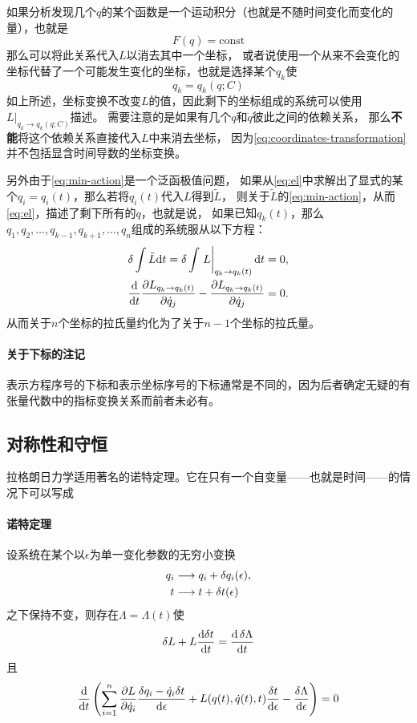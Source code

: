 \documentclass[UTF8, a4paper]{ctexart}
\newcommand*{\diff}{\mathop{}\!\mathrm{d}}
\newcommand*{\const}{\mathrm{const}}
\begin{document}
如果分析发现几个$q$的某个函数是一个运动积分（也就是不随时间变化而变化的量），也就是
\[
    F(q) = \const
\]
那么可以将此关系代入$L$以消去其中一个坐标，
或者说使用一个从来不会变化的坐标代替了一个可能发生变化的坐标，也就是选择某个$q_k$使
\[
    q_k = q_k(q;C)
\]
如上所述，坐标变换不改变$L$的值，因此剩下的坐标组成的系统可以使用$L|_{q_k\to q_k(q;C)}$描述。
需要注意的是如果有几个$q$和$\dot{q}$彼此之间的依赖关系，
那么\textbf{不能}将这个依赖关系直接代入$L$中来消去坐标，
因为\eqref{eq:coordinates-transformation}并不包括显含时间导数的坐标变换。

另外由于\eqref{eq:min-action}是一个泛函极值问题，
如果从\eqref{eq:el}中求解出了显式的某个$q_i=q_i(t)$，那么若将$q_i(t)$代入$L$得到$\tilde{L}$，
则关于$\tilde{L}$的\eqref{eq:min-action}，从而\eqref{eq:el}，描述了剩下所有的$q$，也就是说，
如果已知$q_k(t)$，那么$q_1, q_2, \ldots, q_{k-1}, q_{k+1}, \ldots, q_n$组成的系统服从以下方程：
\[
    \begin{split}
        \var \int \tilde{L} \dd t = \var \int \eval{L}_{q_k \to q_k(t)} \dd t = 0, \\
        \dv{t} \pdv{L_{q_k \to q_k(t)}}{\dot{q}_j} - \pdv{L_{q_k \to q_k(t)}}{\dot{q}_j} = 0.
    \end{split}
\]
从而关于$n$个坐标的拉氏量约化为了关于$n-1$个坐标的拉氏量。

\paragraph{关于下标的注记}
表示方程序号的下标和表示坐标序号的下标通常是不同的，因为后者确定无疑的有张量代数中的指标变换关系而前者未必有。

\subsection{对称性和守恒}\label{sec:symmetry-and-conservation}

拉格朗日力学适用著名的诺特定理。它在只有一个自变量——也就是时间——的情况下可以写成
\paragraph{诺特定理} 设系统在某个以$\epsilon$为单一变化参数的无穷小变换
\[
    \begin{aligned}
        q_i &\longrightarrow q_i + \var q_i(\epsilon), \\
        t &\longrightarrow t + \var t(\epsilon)
    \end{aligned}
\]
之下保持不变，则存在$\Lambda=\Lambda(t)$使
\[
    \var L + L \frac{\diff \var t}{\diff t}
    = \dv{\var{\Lambda}}{t} 
\]
且
\begin{equation}
    \frac{\diff }{\diff t} \left(
        \sum_{i=1}^n \frac{\partial L}{\partial \dot{q}_i} \frac{\var q_i - \dot{q}_i \var t}{\diff \epsilon}
        + L(q(t), \dot{q}(t), t) \frac{\var t}{\diff \epsilon} - \frac{\var \Lambda}{\diff \epsilon} 
    \right) = 0
    \label{eq:noether}
\end{equation}
\end{document}
